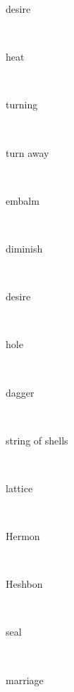 \documentclass[a4paper]{article}
\begin{document}
\begin{multicols}{4}
\begin{multicols}{4}
\begin{multicols}{5}
{\hebrewfont{}} \begin{english}desire\end{english}\\
{\hebrewfont{}} \begin{english}heat\end{english}\\
{\hebrewfont{}} \begin{english}turning\end{english}\\
{\hebrewfont{}} \begin{english}turn away\end{english}\\
{\hebrewfont{}} \begin{english}embalm\end{english}\\
{\hebrewfont{}} \begin{english}diminish\end{english}\\
{\hebrewfont{}} \begin{english}desire\end{english}\\
{\hebrewfont{}} \begin{english}hole\end{english}\\
{\hebrewfont{}} \begin{english}dagger\end{english}\\
{\hebrewfont{}} \begin{english}string of shells\end{english}\\
{\hebrewfont{}} \begin{english}lattice\end{english}\\
{\hebrewfont{}} \begin{english}Hermon\end{english}\\
{\hebrewfont{}} \begin{english}Heshbon\end{english}\\
{\hebrewfont{}} \begin{english}seal\end{english}\\
{\hebrewfont{}} \begin{english}marriage\end{english}\\

\end{multicols}
\end{multicols}
\end{multicols}
\end{document}
